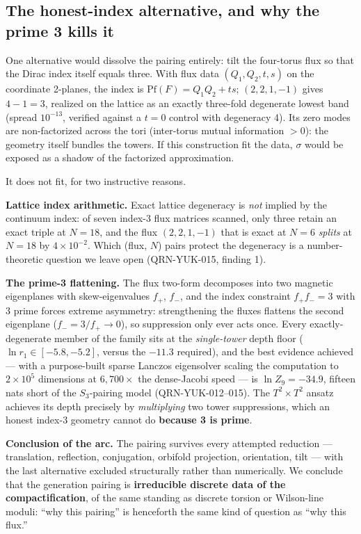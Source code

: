 \documentclass[aps,prd,preprint,nofootinbib]{revtex4-2}
\begin{document}
\subsection{The honest-index alternative, and why the prime 3 kills it}
\label{sec:honest}

One alternative would dissolve the pairing entirely: tilt the four-torus flux
so that the Dirac index itself equals three. With flux data $(Q_1,Q_2,t,s)$ on
the coordinate 2-planes, the index is $\mathrm{Pf}(F)=Q_1Q_2+ts$;
$(2,2,1,-1)$ gives $4-1=3$, realized on the lattice as an exactly three-fold
degenerate lowest band (spread $10^{-13}$, verified against a $t=0$ control
with degeneracy 4). Its zero modes are non-factorized across the tori
(inter-torus mutual information $>0$): the geometry itself bundles the towers.
If this construction fit the data, $\sigma$ would be exposed as a shadow of the
factorized approximation.

It does not fit, for two instructive reasons.

\textbf{Lattice index arithmetic.} Exact lattice degeneracy is \emph{not}
implied by the continuum index: of seven index-3 flux matrices scanned, only
three retain an exact triple at $N=18$, and the flux $(2,2,1,-1)$ that is exact
at $N=6$ \emph{splits} at $N=18$ by $4\times 10^{-2}$. Which (flux, $N$) pairs
protect the degeneracy is a number-theoretic question we leave open
(QRN-YUK-015, finding 1).

\textbf{The prime-3 flattening.} The flux two-form decomposes into two magnetic
eigenplanes with skew-eigenvalues $f_+$, $f_-$, and the index constraint
$f_+f_-=3$ with 3 prime forces extreme asymmetry: strengthening the fluxes
flattens the second eigenplane ($f_-=3/f_+\to 0$), so suppression only ever
acts once. Every exactly-degenerate member of the family sits at the
\emph{single-tower} depth floor ($\ln r_1\in[-5.8,-5.2]$, versus the $-11.3$
required), and the best evidence achieved --- with a purpose-built sparse
Lanczos eigensolver scaling the computation to $2\times 10^5$ dimensions at
$6{,}700\times$ the dense-Jacobi speed --- is $\ln Z_9=-34.9$, fifteen nats
short of the $S_3$-pairing model (QRN-YUK-012--015). The $T^2\times T^2$ ansatz
achieves its depth precisely by \emph{multiplying} two tower suppressions,
which an honest index-3 geometry cannot do \textbf{because 3 is prime}.

\textbf{Conclusion of the arc.} The pairing survives every attempted reduction
--- translation, reflection, conjugation, orbifold projection, orientation,
tilt --- with the last alternative excluded structurally rather than
numerically. We conclude that the generation pairing is \textbf{irreducible
discrete data of the compactification}, of the same standing as discrete
torsion or Wilson-line moduli: ``why this pairing'' is henceforth the same kind
of question as ``why this flux.''
\end{document}
